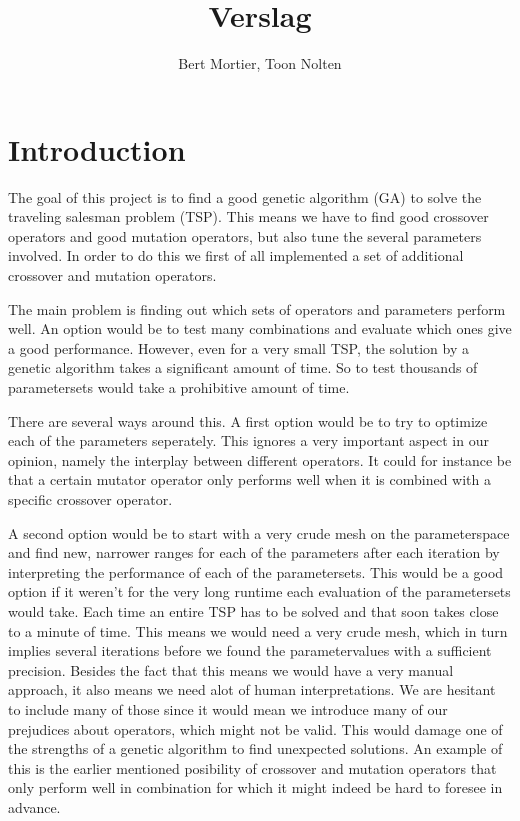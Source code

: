 \documentclass[a4paper]{article}
\title{Verslag}
\author{Bert Mortier, Toon Nolten}
\date{}
\begin{document}
\maketitle

\section{Introduction}

The goal of this project is to find a good genetic algorithm (GA) to solve the traveling salesman problem (TSP). This means we have to find good crossover operators and good mutation operators, but also tune the several parameters involved. In order to do this we first of all implemented a set of additional crossover and mutation operators.
\par
The main problem is finding out which sets of operators and parameters perform well. An option would be to test many combinations and evaluate which ones give a good performance. However, even for a very small TSP, the solution by a genetic algorithm takes a significant amount of time. So to test thousands of parametersets would take a prohibitive amount of time.
\par
There are several ways around this. A first option would be to try to optimize each of the parameters seperately. This ignores a very important aspect in our opinion, namely the interplay between different operators. It could for instance be that a certain mutator operator only performs well when it is combined with a specific crossover operator. 
\par 
A second option would be to start with a very crude mesh on the parameterspace and find new, narrower ranges for each of the parameters after each iteration by interpreting the performance of each of the parametersets. This would be a good option if it weren't for the very long runtime each evaluation of the parametersets would take. Each time an entire TSP has to be solved and that soon takes close to a minute of time. This means we would need a very crude mesh, which in turn implies several iterations before we found the parametervalues with a sufficient precision. Besides the fact that this means we would have a very manual approach, it also means we need alot of human interpretations. We are hesitant to include many of those since it would mean we introduce many of our prejudices about operators, which might not be valid. This would damage one of the strengths of a genetic algorithm to find unexpected solutions.
An example of this is the earlier mentioned posibility of crossover and mutation operators that only perform well in combination for which it might indeed be hard to foresee in advance.
\end{document}
